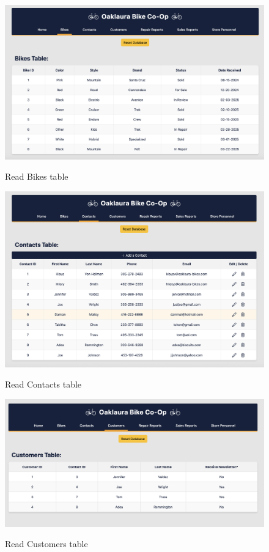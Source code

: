 \documentclass{article}
\begin{document}
\begin{figure}[H]
    \centering
    \caption{Read Bikes table}
    \vspace{0.2cm}
    \includegraphics[width=1.0\textwidth]{UI_screenshots/Read_Bikes_Table.png}
    \label{fig:Read Bikes table}
\end{figure}

\begin{figure}[H]
    \centering
    \caption{Read Contacts table}
    \vspace{0.2cm}
    \includegraphics[width=1.0\textwidth]{UI_screenshots/Read_Contacts_Page.png}
    \label{fig:Read Contacts table}
\end{figure}

\begin{figure}[H]
    \centering
    \caption{Read Customers table}
    \vspace{0.2cm}
    \includegraphics[width=1.0\textwidth]{UI_screenshots/Read_Customers_Table.png}
    \label{fig:Read Customers table}
\end{figure}
\end{document}
